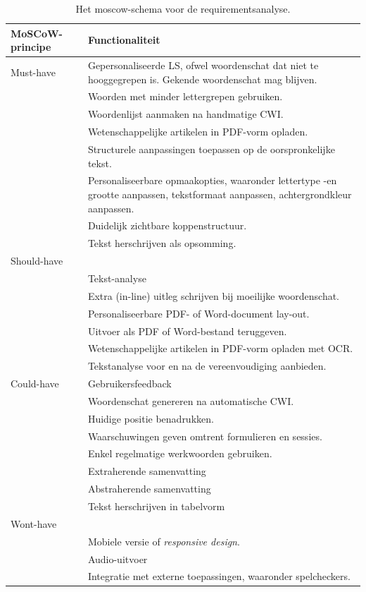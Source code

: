 \begin{center}
	\begin{table}[H]
		\begin{tabular}{ | m{4cm} | m{11cm} | } 
			\hline
			\textbf{MoSCoW-principe} & \textbf{Functionaliteit} \\
			\hline
			Must-have & Gepersonaliseerde LS, ofwel woordenschat dat niet te hooggegrepen is. Gekende woordenschat mag blijven. \\
			& Woorden met minder lettergrepen gebruiken. \\
			& Woordenlijst aanmaken na handmatige CWI. \\
			& Wetenschappelijke artikelen in PDF-vorm opladen. \\
			& Structurele aanpassingen toepassen op de oorspronkelijke tekst. \\
			& Personaliseerbare opmaakopties, waaronder lettertype -en grootte aanpassen, tekstformaat aanpassen, achtergrondkleur aanpassen. \\
			& Duidelijk zichtbare koppenstructuur. \\
			& Tekst herschrijven als opsomming. \\
			\hline
			Should-have & \\
			& Tekst-analyse \\
			& Extra (in-line) uitleg schrijven bij moeilijke woordenschat. \\
			& Personaliseerbare PDF- of Word-document lay-out. \\
			& Uitvoer als PDF of Word-bestand teruggeven. \\
			& Wetenschappelijke artikelen in PDF-vorm opladen met OCR. \\
			& Tekstanalyse voor en na de vereenvoudiging aanbieden. \\
			\hline
			Could-have 
			& Gebruikersfeedback \\
			& Woordenschat genereren na automatische CWI. \\
			& Huidige positie benadrukken. \\
			& Waarschuwingen geven omtrent formulieren en sessies. \\
			& Enkel regelmatige werkwoorden gebruiken. \\
			& Extraherende samenvatting \\
			& Abstraherende samenvatting \\
			& Tekst herschrijven in tabelvorm \\
			\hline
			Wont-have & \\
			& Mobiele versie of \textit{responsive design}. \\
			& Audio-uitvoer \\
			& Integratie met externe toepassingen, waaronder spelcheckers. \\
			\hline
		\end{tabular}
		\caption{Het moscow-schema voor de requirementsanalyse.}
		\label{img:moscow-table}
	\end{table}
\end{center}

